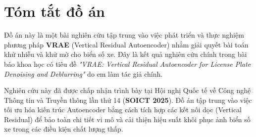 \chapter{Tóm tắt đồ án}
Đồ án này là một bài nghiên cứu tập trung vào việc phát triển và thực nghiệm phương pháp \textbf{VRAE} (Vertical Residual Autoencoder) nhằm giải quyết bài toán khử nhiễu và khử mờ cho biển số xe. Đây là kết quả nghiên cứu chính trong bài báo khoa học có tiêu đề \textit{"VRAE: Vertical Residual Autoencoder for License Plate Denoising and Deblurring"} do em làm tác giả chính. 

Nghiên cứu này đã được chấp nhận trình bày tại Hội nghị Quốc tế về Công nghệ Thông tin và Truyền thông lần thứ 14 (\textbf{SOICT 2025}). Đồ án tập trung vào việc tối ưu hóa kiến trúc Autoencoder bằng cách tích hợp các kết nối dọc (Vertical Residual) để bảo toàn chi tiết vi mô và cải thiện hiệu suất khôi phục ảnh biển số xe trong các điều kiện chất lượng thấp.


